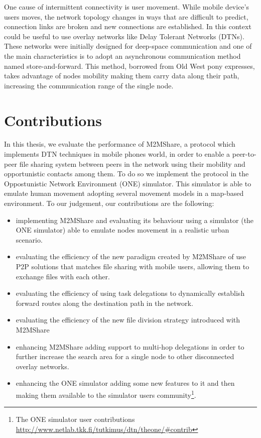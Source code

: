 One cause of intermittent connectivity is user movement. While mobile device's users moves, the network topology changes in ways that are difficult to predict, connection links are broken and new connections are established. In this context could be useful to use overlay networks like Delay Tolerant Networks (DTNs). These networks were initially designed for deep-space communication and one of the main characteristics is to adopt an asynchronous communication method named store-and-forward. This method, borrowed from Old West pony expresses, takes advantage of nodes mobility making them carry data along their path, increasing the communication range of the single node.



\section{Contributions}
In this thesis, we evaluate the performance of M2MShare, a protocol which implements DTN techniques in mobile phones world, in order to enable a peer-to-peer file sharing system between peers in the network using their mobility and opportunistic contacts among them. To do so we implement the protocol in the Oppostunistic Network Environment (ONE) simulator. This simulator is able to emulate human movement adopting several movement models in a map-based environment. To our judgement, our contributions are the following:
\begin{itemize}
\item implementing M2MShare and evaluating its behaviour using a simulator (the ONE simulator) able to emulate nodes movement in a realistic urban scenario.
\item evaluating the efficiency of the new paradigm created by M2MShare of use P2P solutions that matches file sharing with mobile users, allowing them to exchange files with each other.
\item evaluating the efficiency of using task delegations to dynamically establish forward routes along the destination path in the network.
\item evaluating the efficiency of the new file division strategy introduced with M2MShare 
\item enhancing M2MShare adding support to multi-hop delegations in order to further increase the search area for a single node to other disconnected overlay networks.
\item enhancing the ONE simulator adding some new features to it and then making them available to the simulator users community\footnote{The ONE simulator user contributions \href{http://www.netlab.tkk.fi/tutkimus/dtn/theone/\#contrib}{http://www.netlab.tkk.fi/tutkimus/dtn/theone/\#contrib}}.
\end{itemize}

